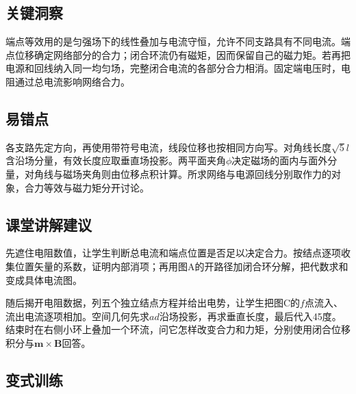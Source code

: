 \documentclass[UTF8,fontset=fandol,a4paper,11pt]{ctexart}
\begin{document}
\subsection*{关键洞察}

端点等效用的是匀强场下的线性叠加与电流守恒，允许不同支路具有不同电流。端点位移确定网络部分的合力；闭合环流仍有磁矩，因而保留自己的磁力矩。若再把电源和回线纳入同一均匀场，完整闭合电流的各部分合力相消。固定端电压时，电阻通过总电流影响网络合力。



\subsection*{易错点}

各支路先定方向，再使用带符号电流，线段位移也按相同方向写。对角线长度$\sqrt5l$含沿场分量，有效长度应取垂直场投影。两平面夹角$\phi$决定磁场的面内与面外分量，对角线与磁场夹角则由位移点积计算。所求网络与电源回线分别取作力的对象，合力等效与磁力矩分开讨论。



\subsection*{课堂讲解建议}

先遮住电阻数值，让学生判断总电流和端点位置是否足以决定合力。按结点逐项收集位置矢量的系数，证明内部消项；再用图A的开路径加闭合环分解，把代数求和变成具体电流图。

随后揭开电阻数据，列五个独立结点方程并给出电势，让学生把图C的$f$点流入、流出电流逐项相加。空间几何先求$ad$沿场投影，再求垂直长度，最后代入45度。结束时在右侧小环上叠加一个环流，问它怎样改变合力和力矩，分别使用闭合位移积分与$\boldsymbol m\times\boldsymbol B$回答。



\subsection*{变式训练}
\end{document}
